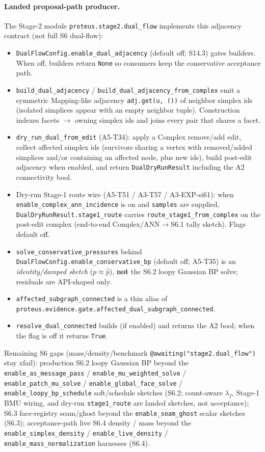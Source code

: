 \documentclass[11pt]{article}
\begin{document}
\paragraph{Landed proposal-path producer.}
The Stage-2 module \texttt{proteus.stage2.dual\_flow} implements this adjacency
contract (not full S6 dual-flow):
\begin{itemize}[leftmargin=1.5em]
  \item \texttt{DualFlowConfig.enable\_dual\_adjacency} (default off; S14.3)
  gates builders. When off, builders return \texttt{None} so consumers keep the
  conservative acceptance path.
  \item \texttt{build\_dual\_adjacency} / \texttt{build\_dual\_adjacency\_from\_complex}
  emit a symmetric Mapping-like adjacency
  \texttt{adj.get(u, ())} of neighbor simplex ids (isolated simplices appear
  with an empty neighbor tuple). Construction indexes facets
  $\to$ owning simplex ids and joins every pair that shares a facet.
  \item \texttt{dry\_run\_dual\_from\_edit} (A5-T34): apply a Complex
  remove/add edit, collect affected simplex ids (survivors sharing a vertex
  with removed/added simplices and/or containing an affected node, plus new
  ids), build post-edit adjacency when enabled, and return
  \texttt{DualDryRunResult} including the A2 connectivity bool.
  \item Dry-run Stage-1 route wire (A5-T51 / A3-T57 / A3-EXP-si61): when
  \texttt{enable\_complex\_ann\_incidence} is on and \texttt{samples} are
  supplied, \texttt{DualDryRunResult.stage1\_route} carries
  \texttt{route\_stage1\_from\_complex} on the post-edit complex
  (end-to-end Complex/ANN$\to$S6.1 tally sketch). Flags default off.
  \item \texttt{solve\_conservative\_pressures} behind
  \texttt{DualFlowConfig.enable\_conservative\_bp} (default off; A5-T35) is an
  \emph{identity/damped sketch} ($p\approx\hat p$), \textbf{not} the S6.2 loopy
  Gaussian BP solve; residuals are API-shaped only.
  \item \texttt{affected\_subgraph\_connected} is a thin alias of
  \texttt{proteus.evidence.gate.affected\_dual\_subgraph\_connected}.
  \item \texttt{resolve\_dual\_connected} builds (if enabled) and returns the
  A2 bool; when the flag is off it returns \texttt{True}.
\end{itemize}
Remaining S6 gaps (mass/density/benchmark
\texttt{@awaiting("stage2.dual\_flow")} stay xfail): production S6.2 loopy
Gaussian BP beyond the
\texttt{enable\_as\_message\_pass} /
\texttt{enable\_mu\_weighted\_solve} /
\texttt{enable\_patch\_mu\_solve} /
\texttt{enable\_global\_face\_solve} /
\texttt{enable\_loopy\_bp\_schedule} soft/schedule sketches (S6.2;
count-aware $\lambda_f$, Stage-1 BMU wiring, and dry-run
\texttt{stage1\_route} are landed sketches, not acceptance);
S6.3 face-registry seam/ghost beyond the
\texttt{enable\_seam\_ghost} scalar sketches (S6.3); acceptance-path live
S6.4 density / mass beyond the \texttt{enable\_simplex\_density} /
\texttt{enable\_live\_density} /
\texttt{enable\_mass\_normalization} harnesses (S6.4).
\end{document}
